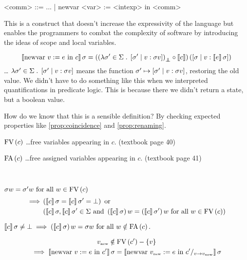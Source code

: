 \begin{enumcirc}
	\item
	\begin{grammar}
		<comm> ::= ... | newvar <var> := <intexp> in <comm>
	\end{grammar}
	This is a construct that doesn't increase the expressivity of the language but
	enables the programmers to combat the complexity of software by introducing the
	ideas of scope and local variables.
	\item
	\[
		\left\llbracket \textrm{newvar } v := e \textrm{ in } c \right\rrbracket \sigma =
		\left( 
			\left( 
				\lambda \sigma' \in \Sigma \;.\; \left[ \sigma' \; \middle\vert \; v : \sigma v \right]
			 \right)_{\bot \mkern-11mu \bot} \circ \left\llbracket c \right\rrbracket
		 \right) \left( 
			\left[ \sigma \; \middle\vert \; v : \left\llbracket e \right\rrbracket \sigma \right]
		 \right)
	\]
	\dots
	$\lambda \sigma' \in \Sigma \;.\; \left[ \sigma' \; \middle\vert \; v : \sigma v \right]$
	means the function $\sigma' \mapsto \left[ \sigma' \; \middle\vert \; v: \sigma v \right]$, restoring the
	old value.
	We didn't have to do something like this when we interpreted quantifications in
	predicate logic.
	This is because there we didn't return a state, but a boolean value.
	\item
	How do we know that this is a sensible definition?
	By checking expected properties like \cref{prop:coincidence} and
	\cref{prop:renaming}.

	$\textrm{FV}\left(  c  \right)$ \dots free variables appearing in $c$. (textbook page 40)

	$\textrm{FA}\left(  c  \right)$ \dots free assigned variables appearing in $c$. (textbook page 41)

	\begin{property}[Coincidence]\label{prop:coincidence}
		\;\\
		\vspace{-1.5em}
		\begin{enumalpha}
			\item
			$\sigma w = \sigma' w \textrm{ for all } w \in \textrm{FV}\left(  c  \right)$
			\begin{align*}
				\implies & \left( \left\llbracket c \right\rrbracket\sigma = \left\llbracket c \right\rrbracket\sigma' = \bot \right) \textrm{ or } \\
				         & \left( 
					\left\llbracket c \right\rrbracket\sigma, \left\llbracket c \right\rrbracket\sigma' \in \Sigma \textrm{ and }
					\left( \left\llbracket c \right\rrbracket\sigma \right) w = \left( \left\llbracket c \right\rrbracket\sigma' \right) w \textrm{ for all } w \in \textrm{FV}\left(  c  \right)
				 \right)
			\end{align*}
			\item
			$
				\left\llbracket c \right\rrbracket\sigma \neq \bot \implies
				\left( \left\llbracket c \right\rrbracket\sigma \right) w = \sigma w \textrm{ for all } w \notin \textrm{FA}\left(  c  \right).
			$
		\end{enumalpha}
	\end{property}
	\begin{property}[Renaming]\label{prop:renaming}
		\begin{multline*}
			v_{\textrm{\tiny new}} \notin \textrm{FV}\left(  c'  \right) - \left\{ v \right\} \\
			\implies \left\llbracket \textrm{newvar } v := e \textrm{ in } c' \right\rrbracket \sigma =
			\left\llbracket \textrm{newvar } v_{\textrm{\tiny new}} := e \textrm{ in } c'/_{v \rightarrow v_{\textrm{\tiny new}}} \right\rrbracket \sigma
		\end{multline*}
	\end{property}
\end{enumcirc}

